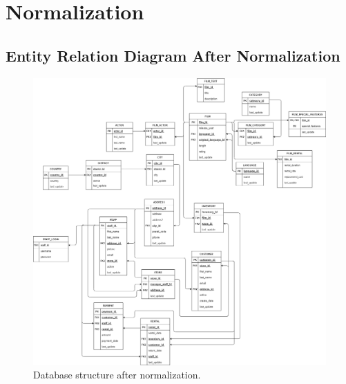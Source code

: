 \documentclass{article}
\begin{document}
\section{Normalization}
	\subsection{Entity Relation Diagram After Normalization}
		\begin{figure}[H]
			\includegraphics[width=\textwidth]{er_normalized}
			\caption{Database structure after normalization.}
		\end{figure}
\end{document}
